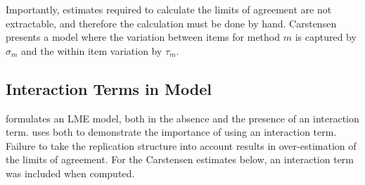 \documentclass[12pt, a4paper]{report}
\theoremstyle{plain}
\theoremstyle{definition}
\theoremstyle{remark}
\begin{document}
Importantly, estimates required to calculate the limits of agreement are not extractable, and therefore the calculation must
be done by hand.
Carstensen presents a model where the variation between items for
method $m$ is captured by $\sigma_m$ and the within item variation
by $\tau_m$.




\newpage





	

	\subsection{Interaction Terms in Model}
	\citet{BXC2008} formulates an LME model, both in the absence and the presence of an interaction term.\citet{bxc} uses both to demonstrate the importance of using an interaction term. Failure to take the replication structure into
	account results in over-estimation of the limits of agreement. For the Carstensen estimates below, an interaction term was included when computed.
	\newpage
	

	
	
	
	
	
	
	
	
	
	\newpage
	

	
	
	
	
	
	
	
	
	
	
	
	
	
	
	
	
	
	
	
	
	
	
	
	
	
	
	
\end{document}

